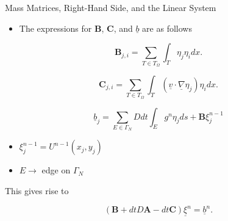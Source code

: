 \documentclass[10pt]{beamer}
\begin{document}
\begin{frame}{ Mass Matrices, Right-Hand Side, and the Linear System} \label{MassmatRHSLinearSystem}
\begin{itemize}
\item The expressions for $\mathbf{B}$, $\mathbf{C}$, and $\underline{b}$ are as follows
\end{itemize}

\begin{equation}
\mathbf{B}_{j,i} = \sum_{T \in T_{\Omega}} \int_{T} \eta_{j}\eta_{i} dx.
\end{equation}

\begin{equation}
\mathbf{C}_{j,i} = \sum_{T \in T_{\Omega}}\int_{T}\left(\underline{v}\cdot \underline{\nabla}\eta_{j}\right)\eta_{i} dx.
\end{equation}

\begin{equation}
\underline{b}_{j}=\sum_{E \in \Gamma_{N}} Ddt\int_{E}g^{n}\eta_{j}ds+\mathbf{B}\xi_{j}^{n-1}
\end{equation}

\begin{itemize}
\item $\xi_{j}^{n-1} = U^{n-1}\left(x_{j},y_{j}\right)$
\item $E \rightarrow$ edge on $\Gamma_{N}$
\end{itemize}

This gives rise to

\begin{equation}
\left(\mathbf{B}+dtD\mathbf{A}-dt\mathbf{C}\right)\underline{\xi}^{n}=\underline{b}^{n}.
\end{equation}
\hyperlink{Questions}{}
\end{frame}
\end{document}
